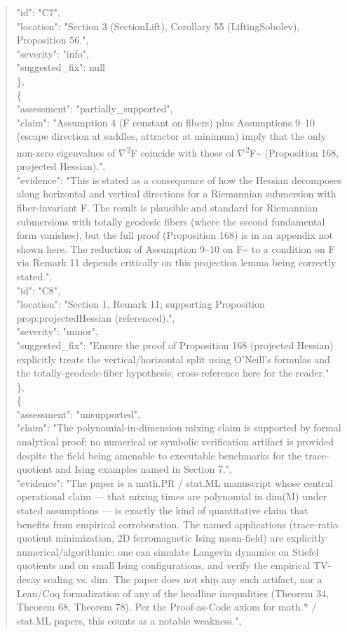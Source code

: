 \documentclass[11pt]{article}
\begin{document}
\begin{quote}
      "id": "C7",\\
      "location": "Section 3 (SectionLift), Corollary 55 (LiftingSobolev), Proposition 56.",\\
      "severity": "info",\\
      "suggested\_fix": null\\
    \},\\
    \{\\
      "assessment": "partially\_supported",\\
      "claim": "Assumption 4 (F constant on fibers) plus Assumptions 9--10 (escape direction at saddles, attractor at minimum) imply that the only non-zero eigenvalues of \ensuremath{\nabla}\textsuperscript{2}F coincide with those of \ensuremath{\nabla}\textsuperscript{2}F\~{} (Proposition 168, projected Hessian).",\\
      "evidence": "This is stated as a consequence of how the Hessian decomposes along horizontal and vertical directions for a Riemannian submersion with fiber-invariant F. The result is plausible and standard for Riemannian submersions with totally geodesic fibers (where the second fundamental form vanishes), but the full proof (Proposition 168) is in an appendix not shown here. The reduction of Assumption 9--10 on F\~{} to a condition on F via Remark 11 depends critically on this projection lemma being correctly stated.",\\
      "id": "C8",\\
      "location": "Section 1, Remark 11; supporting Proposition prop:projectedHessian (referenced).",\\
      "severity": "minor",\\
      "suggested\_fix": "Ensure the proof of Proposition 168 (projected Hessian) explicitly treats the vertical/horizontal split using O'Neill's formulas and the totally-geodesic-fiber hypothesis; cross-reference here for the reader."\\
    \},\\
    \{\\
      "assessment": "unsupported",\\
      "claim": "The polynomial-in-dimension mixing claim is supported by formal analytical proof; no numerical or symbolic verification artifact is provided despite the field being amenable to executable benchmarks for the trace-quotient and Ising examples named in Section 7.",\\
      "evidence": "The paper is a math.PR / stat.ML manuscript whose central operational claim --- that mixing times are polynomial in dim(M) under stated assumptions --- is exactly the kind of quantitative claim that benefits from empirical corroboration. The named applications (trace-ratio quotient minimization, 2D ferromagnetic Ising mean-field) are explicitly numerical/algorithmic: one can simulate Langevin dynamics on Stiefel quotients and on small Ising configurations, and verify the empirical TV-decay scaling vs. dim. The paper does not ship any such artifact, nor a Lean/Coq formalization of any of the headline inequalities (Theorem 34, Theorem 68, Theorem 78). Per the Proof-as-Code axiom for math.* / stat.ML papers, this counts as a notable weakness.",\\

\end{quote}
\end{document}
